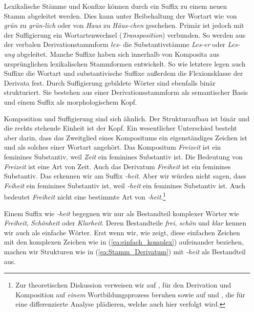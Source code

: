 Lexikalische Stämme und Konfixe können durch ein Suffix zu einem neuen Stamm abgeleitet werden. Dies kann unter Beibehaltung der Wortart wie von \textit{grün} zu \textit{grün-lich} oder von \textit{Haus} zu \textit{Häus-chen} geschehen. Primär ist jedoch mit der Suffigierung ein Wortartenwechsel (\textit{Transposition}) verbunden. So werden aus der verbalen Derivationstammform \textit{les-} die Substantivstämme \textit{Les-er} oder \textit{Les-ung} abgeleitet. Manche Suffixe haben sich innerhalb von Komposita aus ursprünglichen lexikalischen Stammformen entwickelt. So wie letztere legen auch Suffixe die Wortart und substantivische Suffixe außerdem die Flexionsklasse der Derivata fest. Durch Suffigierung gebildete Wörter sind ebenfalls binär strukturiert. Sie bestehen aus einer Derivationsstammform als semantischer Basis und einem Suffix als morphologischem Kopf. 

Komposition und Suffigierung sind sich ähnlich. Der Strukturaufbau ist binär und die rechts stehende Einheit ist der Kopf. Ein wesentlicher Unterschied besteht aber darin, dass das Zweitglied eines Kompositums ein eigenständiges Zeichen ist und als solches einer Wortart angehört. Das Kompositum \textit{Freizeit} ist ein feminines Substantiv, weil \textit{Zeit} ein feminines Substantiv ist. Die Bedeutung von \textit{Freizeit} ist eine Art von Zeit. Auch das Derivatum \textit{Freiheit} ist ein feminines Substantiv. Das erkennen wir am Suffix \textit{-heit}. Aber wir würden nicht sagen, dass \textit{Feiheit} ein feminines Substantiv ist, weil \textit{-heit} ein feminines Substantiv ist. Auch bedeutet \textit{Freiheit} nicht eine bestimmte Art von \textit{-heit}.\footnote{Zur theoretischen Diskussion verweisen wir auf \citet{Hoehle1982DerivKomp}, für den Derivation und Komposition auf \textit{einem} Wortbildungsprozess beruhen sowie auf \citet{Reis1983} und \citet{Welke1995DerivKomp}, die für eine differenzierte Analyse plädieren, welche auch hier verfolgt wird.}

Einem Suffix wie \textit{-heit} begegnen wir nur als Bestandteil komplexer Wörter wie \textit{Freiheit}, \textit{Schönheit} oder \textit{Klarheit}. Deren Bestandteile \textit{frei}, \textit{schön} und \textit{klar} kennen wir auch als einfache Wörter. Erst wenn wir, wie \citet[543--544]{Booij2010} zeigt, diese einfachen Zeichen mit den komplexen Zeichen wie in (\ref{ea:einfach_komplex}) aufeinander beziehen, machen wir Strukturen wie in (\ref{ea:Stamm_Derivatum}) mit \textit{-heit} als Bestandteil aus.

